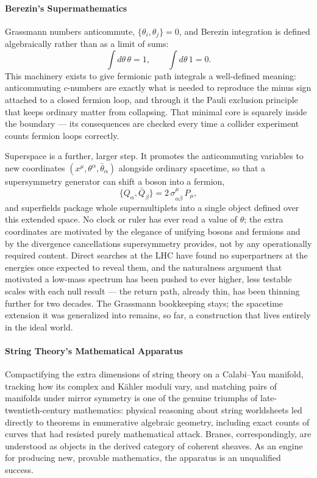 \paragraph{Berezin's Supermathematics }
Grassmann numbers anticommute, $\{\theta_i,\theta_j\}=0$, and Berezin
integration is defined algebraically rather than as a limit of sums:
\[
\int d\theta\,\theta = 1, \qquad \int d\theta\, 1 = 0 .
\]
This machinery exists to give fermionic path integrals a well-defined meaning:
anticommuting $c$-numbers are exactly what is needed to reproduce the minus
sign attached to a closed fermion loop, and through it the Pauli exclusion
principle that keeps ordinary matter from collapsing. That minimal core is
squarely inside the boundary --- its consequences are checked every time a
collider experiment counts fermion loops correctly.

Superspace is a further, larger step. It promotes the anticommuting variables
to new coordinates $(x^\mu,\theta^\alpha,\bar\theta_{\dot\alpha})$ alongside
ordinary spacetime, so that a supersymmetry generator can shift a boson into a
fermion,
\[
\{Q_\alpha, \bar Q_{\dot\beta}\} = 2\,\sigma^\mu_{\alpha\dot\beta}\,P_\mu ,
\]
and superfields package whole supermultiplets into a single object defined over
this extended space. No clock or ruler has ever read a value of $\theta$; the
extra coordinates are motivated by the elegance of unifying bosons and fermions
and by the divergence cancellations supersymmetry provides, not by any
operationally required content. Direct searches at the LHC have found no
superpartners at the energies once expected to reveal them, and the naturalness
argument that motivated a low-mass spectrum has been pushed to ever higher,
less testable scales with each null result --- the return path, already thin,
has been thinning further for two decades. The Grassmann bookkeeping stays; the
spacetime extension it was generalized into remains, so far, a construction
that lives entirely in the ideal world.

\paragraph{String Theory's Mathematical Apparatus }
Compactifying the extra dimensions of string theory on a Calabi--Yau manifold,
tracking how its complex and K\"ahler moduli vary, and matching pairs of
manifolds under mirror symmetry is one of the genuine triumphs of
late-twentieth-century mathematics: physical reasoning about string worldsheets
led directly to theorems in enumerative algebraic geometry, including exact
counts of curves that had resisted purely mathematical attack. Branes,
correspondingly, are understood as objects in the derived category of coherent
sheaves. As an engine for producing new, provable mathematics, the apparatus is
an unqualified success.

